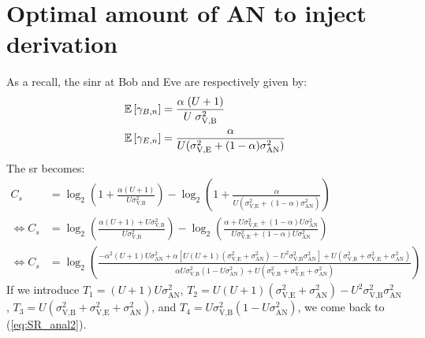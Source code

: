 \renewcommand{\theparagraph}{B}

\section{Optimal amount of AN to inject derivation}\label{appB:alpha}
As a recall, the \gls{sinr} at Bob and Eve are respectively given by:
\begin{equation}
    \begin{split}
        \mathbb{E} \left[\gamma_{B,n}\right] &= \frac{\alpha \;(U+1)}{U \; \sigma_{\text{V,B}}^2} \\
        \mathbb{E} \left[\gamma_{E,n}\right] &= \frac{\alpha}{U(\sigma^2_{\text{V,E}}+(1-\alpha)\sigma^2_{\text{AN}})} 
    \end{split}
\end{equation}
The \gls{sr} becomes:
\begin{subequations}
\begin{align}
    C_s &= \log_2\left(1+ \frac{\alpha (U+1)}{U  \sigma_{\text{V,B}}^2}\right) - \log_2\left(1 + \frac{\alpha}{U(\sigma^2_{\text{V,E}}+(1-\alpha)\sigma^2_{\text{AN}})} \right)\\
    \Leftrightarrow C_s &= \log_2\left( \frac{\alpha (U+1) + U  \sigma_{\text{V,B}}^2}{U  \sigma_{\text{V,B}}^2} \right) - \log_2\left(  \frac{\alpha + U\sigma^2_{\text{V,E}}+(1-\alpha)U\sigma^2_{\text{AN}}}{U\sigma^2_{\text{V,E}}+(1-\alpha)U\sigma^2_{\text{AN}}}  \right)\\
    \Leftrightarrow C_s &= \log_2\left(  \frac{-\alpha^2(U+1)U\sigma^2_{\text{AN}} + \alpha\left[ U(U+1)(\sigma^2_{\text{V,E}}+\sigma^2_{\text{AN}}) - U^2\sigma^2_{\text{V,B}}\sigma^2_{\text{AN}}\right]  + U(\sigma^2_{\text{V,B}}+\sigma^2_{\text{V,E}}+\sigma^2_{\text{AN}})}{\alpha U \sigma^2_{\text{V,B}}(1-U\sigma^2_{\text{AN}}) + U(\sigma^2_{\text{V,B}}+\sigma^2_{\text{V,E}}+\sigma^2_{\text{AN}}) }   \right)
\end{align}
\end{subequations}
If we introduce $T_1=(U+1)U\sigma^2_{\text{AN}}$, $T_2=U(U+1)(\sigma^2_{\text{V,E}}+\sigma^2_{\text{AN}}) - U^2\sigma^2_{\text{V,B}}\sigma^2_{\text{AN}}$, $T_3=U(\sigma^2_{\text{V,B}}+\sigma^2_{\text{V,E}}+\sigma^2_{\text{AN}})$, and $T_4=U \sigma^2_{\text{V,B}}(1-U\sigma^2_{\text{AN}})$, we come back to (\ref{eq:SR_anal2}).
